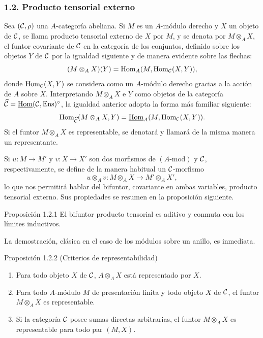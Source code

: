 \subsubsection*{1.2. Producto tensorial externo}
Sea $(\mathcal C,\rho)$ una $A$-categoría abeliana. Si $M$ es un $A$-módulo derecho y $X$ un objeto de $\mathcal C$, se llama producto tensorial externo de $X$ por $M$, y se denota por $M\otimes_A X$, el funtor covariante de $\mathcal C$ en la categoría de los conjuntos, definido sobre los objetos $Y$ de $\mathcal C$ por la igualdad siguiente y de manera evidente sobre las flechas:
\[
(M\otimes_A X)(Y)=\operatorname{Hom}_A(M,\operatorname{Hom}_{\mathcal C}(X,Y)),
\]
donde $\operatorname{Hom}_{\mathcal C}(X,Y)$ se considera como un $A$-módulo derecho gracias a la acción de $A$ sobre $X$. Interpretando $M\otimes_AX$ e $Y$ como objetos de la categoría $\widehat{\mathcal C}=\underline{\operatorname{Hom}}(\mathcal C,\operatorname{Ens})^{\circ}$, la igualdad anterior adopta la forma más familiar siguiente:
\[
\operatorname{Hom}_{\widehat{\mathcal C}}(M\otimes_A X,Y)=\underline{\operatorname{Hom}}_A(M,\operatorname{Hom}_{\mathcal C}(X,Y)).
\]
Si el funtor $M\otimes_A X$ es representable, se denotará y llamará de la misma manera un representante.

Si $u:M\to M'$ y $v:X\to X'$ son dos morfismos de $(A\text{-mod})$ y $\mathcal C$, respectivamente, se define de la manera habitual un $\mathcal C$-morfismo
\[
u\otimes_A v:M\otimes_A X\longrightarrow M'\otimes_A X',
\]
lo que nos permitirá hablar del bifuntor, covariante en ambas variables, producto tensorial externo. Sus propiedades se resumen en la proposición siguiente.

\begin{statement}{Proposición 1.2.1}
El bifuntor producto tensorial es aditivo y conmuta con los límites inductivos.
\end{statement}
La demostración, clásica en el caso de los módulos sobre un anillo, es inmediata.

\begin{statement}{Proposición 1.2.2 (Criterios de representabilidad)}
\begin{enumerate}[label=(\alph*)]
\item Para todo objeto $X$ de $\mathcal C$, $A\otimes_AX$ está representado por $X$.
\item Para todo $A$-módulo $M$ de presentación finita y todo objeto $X$ de $\mathcal C$, el funtor $M\otimes_AX$ es representable.
\item Si la categoría $\mathcal C$ posee sumas directas arbitrarias, el funtor $M\otimes_A X$ es representable para todo par $(M,X)$.
\end{enumerate}
\end{statement}

